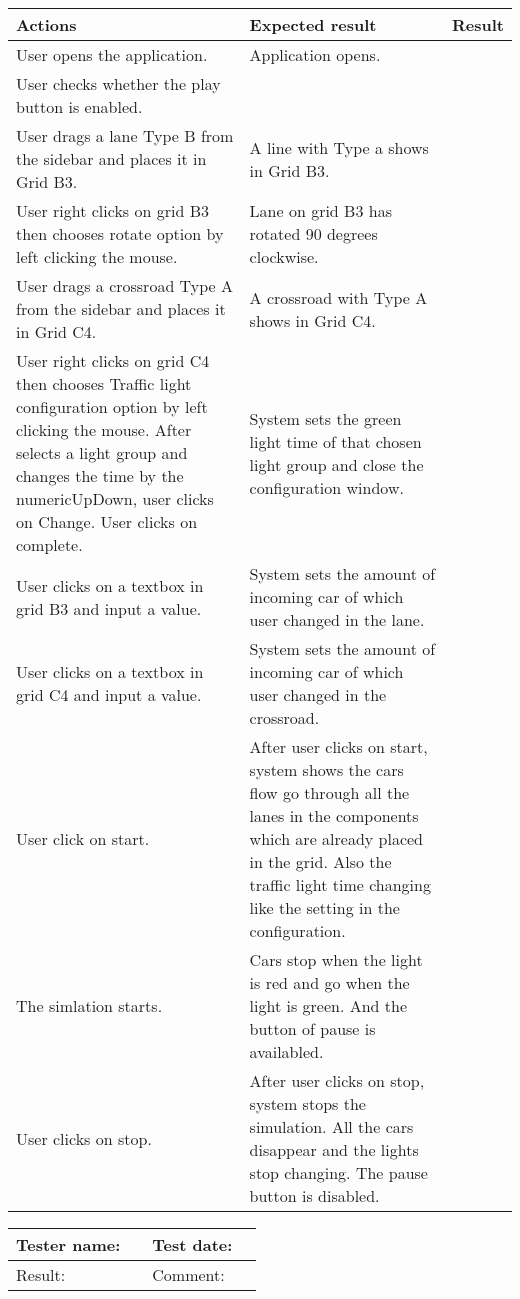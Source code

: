	\begin{tabularx}{\textwidth}{|X|X|p{2.5cm}|}\hline
	    Actions & Expected result & Result \\\hline
	    User opens the application.& Application opens. &  \pass \\\hline
	    User checks whether the play button is enabled. & &  \pass \\\hline
	    User drags a lane Type B from the sidebar and places it in Grid B3. & A line with Type a shows in Grid B3. & \pass \\\hline
	    User right clicks on grid B3 then chooses rotate option by left clicking the mouse. & Lane on grid B3 has rotated 90 degrees clockwise. & \pass \\\hline
	    User drags a crossroad Type A from the sidebar and places it in Grid C4. & A crossroad with Type A shows in Grid C4. & \pass \\\hline
	    User right clicks on grid C4 then chooses Traffic light configuration  option by left clicking the mouse. After selects a light group and changes the time by the numericUpDown, user clicks on Change. User clicks on complete. & System sets the green light time of that chosen light group and close the configuration window.  & \pass \\\hline
	    User clicks on a textbox in grid B3 and input a value. & System sets the amount of incoming car of which user changed in the lane. & \pass \\\hline
	    User clicks on a textbox in grid C4 and input a value. & System sets the amount of incoming car of which user changed in the crossroad. & \pass \\\hline
	    User click on start. & After user clicks on start, system shows the cars flow go through all the lanes in the components which are already placed in the grid. Also the traffic light time changing like the setting in the configuration. & \pass \\\hline
	    The simlation starts. &	Cars stop when the light is red and go when the light is green. And the button of pause is availabled. & \pass \\\hline	
	    User clicks on stop. & After user clicks on stop, system stops the simulation. All the cars disappear and the lights stop changing. The pause button is disabled. & \pass \\\hline    
	\end{tabularx}

\begin{tabularx}{\textwidth}{|p{3cm}X|p{3cm}X|}\hline
	Tester name: &  & Test date: & \\\hline
	Result: &  \pass & Comment: & \\\hline
\end{tabularx}


